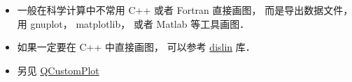 
\begin{issues}
\issueDraft
\end{issues}

\begin{itemize}
\item 一般在科学计算中不常用 C++ 或者 Fortran 直接画图， 而是导出数据文件， 用 gnuplot， matplotlib， 或者 Matlab 等工具画图．
\item 如果一定要在 C++ 中直接画图， 可以参考 \href{https://www.dislin.de/}{dislin} 库．
\item 另见 \href{https://www.qcustomplot.com/}{QCustomPlot}
\end{itemize}
